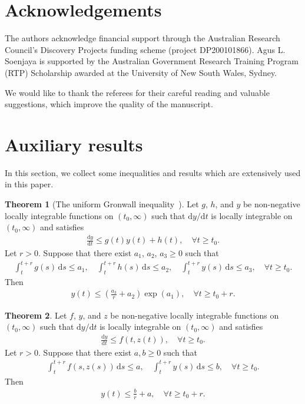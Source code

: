 \documentclass[11pt, reqno]{amsart}
\theoremstyle{definition}
\newtheorem{theorem}{Theorem}[section]
\numberwithin{equation}{section}
\newcommand{\dt}{\mathrm{d}t}
\newcommand{\ds}{\mathrm{d}s}
\newcommand{\dy}{\mathrm{d}y}
\begin{document}
\section*{Acknowledgements}
The authors acknowledge financial support through the Australian Research Council's Discovery Projects funding scheme (project DP200101866).
Agus L. Soenjaya is supported by the Australian Government Research Training Program (RTP) Scholarship awarded at the University of New South Wales, Sydney.

We would like to thank the referees for their careful reading and valuable suggestions, which improve the quality of the manuscript.


\appendix

\section{Auxiliary results}

In this section, we collect some inequalities and results which are extensively used in this paper.

\begin{theorem}[The uniform Gronwall inequality~\cite{Rob01}]\label{the:unif gronwall}
	Let $g$, $h$, and $y$ be non-negative locally integrable functions on $(t_0, \infty)$ such that $\dy/\dt$ is locally integrable on $(t_0,\infty)$ and satisfies
	\begin{align}\label{equ:ineq dydt}
		\frac{\dy}{\dt} \leq g(t)y(t)+h(t), \quad \forall t\geq t_0.
	\end{align}
	Let $r>0$. Suppose that there exist $a_1$, $a_2$, $a_3 \geq 0$ such that
	\begin{align*}
		\int_t^{t+r} g(s)\, \ds \leq a_1,
		\quad
		\int_t^{t+r} h(s) \, \ds \leq a_2,
		\quad 
		\int_t^{t+r} y(s)\, \ds \leq a_3,
		\quad \forall t\geq t_0.
	\end{align*}
	Then
	\begin{align*}
		y(t) \leq \left(\frac{a_3}{r}+a_2\right) \exp(a_1),
		\quad \forall t\geq t_0+r.
	\end{align*}
\end{theorem}


\begin{theorem}\label{the:unif gronw 2}
    Let $f$, $y$, and $z$ be non-negative locally integrable functions on $(t_0, \infty)$ such that $\dy/\dt$ is locally integrable on $(t_0,\infty)$ and satisfies
	\begin{align}\label{equ:ineq f dydt}
		\frac{\dy}{\dt} \leq f(t, z(t)), \quad \forall t\geq t_0.
	\end{align}
	Let $r>0$. Suppose that there exist $a,b \geq 0$ such that
	\begin{align}\label{equ:assum gron2}
		\int_t^{t+r} f(s, z(s))\, \ds \leq a,
		\quad
		\int_t^{t+r} y(s) \, \ds \leq b,
		\quad \forall t\geq t_0.
	\end{align}
	Then
	\begin{align*}
		y(t) \leq \frac{b}{r}+a,
		\quad \forall t\geq t_0+r.
	\end{align*}
\end{theorem}
\end{document}
